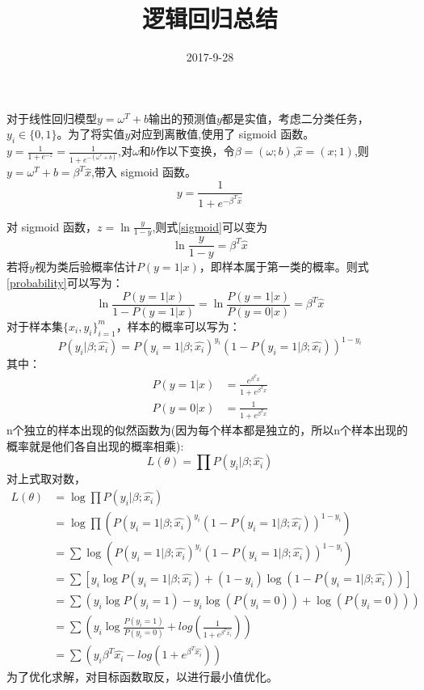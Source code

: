 \documentclass[a4paper]{article}
\begin{document}
    \title{逻辑回归总结}
    \date{2017-9-28}
    \maketitle
    
    对于线性回归模型$y=\omega^T+b$输出的预测值$y$都是实值，考虑二分类任务，$y_i\in\{0,1\}$。为了将实值$y$对应到离散值,使用了 sigmoid 函数。$y=\frac{1}{1+e^{-z}}=\frac{1}{1+e^{-(\omega^T+b)}}$,对$\omega$和$b$作以下变换，令$\beta=(\omega;b)$,$\hat{x}=(x;1)$,则$y=\omega^T+b=\beta^T\hat{x}$,带入 sigmoid 函数。
	\begin{equation}\label{sigmoid}
		y=\frac{1}{1+e^{-\beta^T\hat{x}}}
	\end{equation}
	
	对 sigmoid 函数，$z=\ln\frac{y}{1-y}$,则式\eqref{sigmoid}可以变为
	\begin{equation}\label{probability}
		\ln\frac{y}{1-y}=\beta^T\hat{x}
	\end{equation}
	若将$y$视为类后验概率估计$P(y=1|x)$，即样本属于第一类的概率。则式\eqref{probability}可以写为：
	\begin{equation*}
		\ln\frac{P(y=1|x)}{1-P(y=1|x)}=\ln\frac{P(y=1|x)}{P(y=0|x)}=\beta^T\hat{x}
	\end{equation*}
	对于样本集$\{x_i,y_i\}^{m}_{i=1}$，样本的概率可以写为：
	\begin{equation*}
		P(y_i|\beta;\hat{x_i})=P(y_i=1|\beta;\hat{x_i})^{y_i}\left(1-P(y_i=1|\beta;\hat{x_i})\right)^{1-y_i}
	\end{equation*}
	其中：
	\begin{align}
		P(y=1|x)&=\frac{e^{\beta^Tx}}{1+e^{\beta^Tx}}\\
		P(y=0|x)&=\frac{1}{1+e^{\beta^Tx}}
	\end{align}
	n个独立的样本出现的似然函数为(因为每个样本都是独立的，所以n个样本出现的概率就是他们各自出现的概率相乘):
	\begin{equation}
	L(\theta)=\prod	P(y_i|\beta;\hat{x_i})	
	\end{equation}
	对上式取对数，
	\begin{equation}\label{siran}
		\begin{split}
		L(\theta)&=\log\prod	P(y_i|\beta;\hat{x_i})\\
		&=\log \prod \left(P(y_i=1|\beta;\hat{x_i})^{y_i}\left(1-P(y_i=1|\beta;\hat{x_i})\right)^{1-y_i} \right)\\
		&=\sum\log \left(P(y_i=1|\beta;\hat{x_i})^{y_i}\left(1-P(y_i=1|\beta;\hat{x_i})\right)^{1-y_i} \right)\\
		&=\sum \left[ y_i\log P(y_i=1|\beta;\hat{x_i}) + (1-y_i)\log(1-P(y_i=1|\beta;\hat{x_i}))\right]\\
		&=\sum \left( y_i \log P(y_i=1) - y_i \log(P(y_i=0))+\log(P(y_i=0))\right)\\
		&=\sum \left( y_i \log \frac{P(y_i=1)}{P(y_i=0)} + log(\frac{1}{1+e^{\beta^T\hat{x_i}}})\right)\\
		&=\sum \left( 	
		y_i\beta^T\hat{x_i}-log(1+e^{\beta^T\hat{x_i}})
		\right)
		\end{split}	 	
	\end{equation}
	为了优化求解，对目标函数取反，以进行最小值优化。
	
\end{document}
